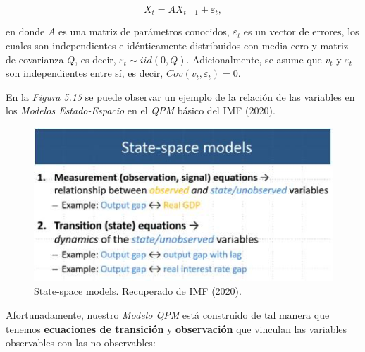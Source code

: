 \documentclass[
]{book}
\begin{document}
\begin{equation}
X_t = A X_{t-1} + \varepsilon_t,
\label{eq:Tra}
\end{equation}

en donde \(A\) es una matriz de parámetros conocidos, \(\varepsilon_t\) es un vector de errores, los cuales son independientes e idénticamente distribuidos con media cero y matriz de covarianza \(Q\), es decir, \(\varepsilon_t \sim iid(0,Q)\). Adicionalmente, se asume que \(v_t\) y \(\varepsilon_t\) son independientes entre sí, es decir, \(Cov(v_t,\varepsilon_t) = 0\).

En la \emph{Figura 5.15} se puede observar un ejemplo de la relación de las variables en los \emph{Modelos Estado-Espacio} en el \emph{QPM} básico del IMF (2020).

\begin{figure}

{\centering \includegraphics[width=0.6\linewidth]{Plots/StateSpace} 

}

\caption{State-space models. Recuperado de IMF (2020).}\label{fig:unnamed-chunk-23}
\end{figure}

Afortunadamente, nuestro \emph{Modelo QPM} está construido de tal manera que tenemos \textbf{ecuaciones de transición} y \textbf{observación} que vinculan las variables observables con las no observables:
\end{document}
